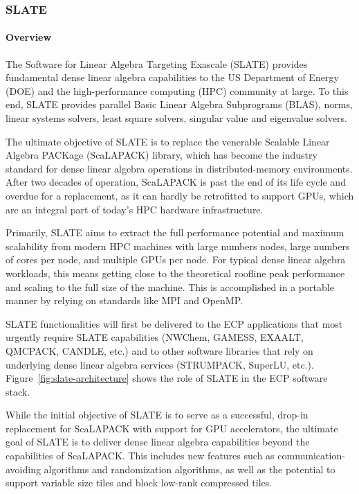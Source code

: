 \subsubsection{ SLATE}\label{subsubsect:slate}

\paragraph{Overview}

The Software for Linear Algebra Targeting Exascale (SLATE)
provides fundamental dense linear algebra capabilities
to the US Department of Energy (DOE)
and the high-performance computing (HPC) community at large.
To this end, SLATE provides
parallel Basic Linear Algebra Subprograms (BLAS), norms,
linear systems solvers, least square solvers,
singular value and eigenvalue solvers.

The ultimate objective of SLATE is to replace the
venerable Scalable Linear Algebra PACKage (ScaLAPACK) library,
which has become the industry standard for dense linear algebra operations
in distributed-memory environments.
After two decades of operation,
ScaLAPACK is past the end of its life cycle and overdue for a replacement,
as it can hardly be retrofitted to support GPUs,
which are an integral part of today's HPC hardware infrastructure.

Primarily, SLATE aims to extract the full performance potential and maximum
scalability from modern HPC machines with large numbers nodes,
large numbers of cores per node, and multiple GPUs per node.
For typical dense linear algebra workloads, this means getting close
to the theoretical roofline peak performance and scaling to the full size of
the machine.
This is accomplished in a portable manner by relying on standards
like MPI and OpenMP.

SLATE functionalities will first be delivered to the ECP applications
that most urgently require SLATE capabilities
(NWChem, GAMESS, EXAALT, QMCPACK, CANDLE, etc.)
and to other software libraries
that rely on underlying dense linear algebra services
(STRUMPACK, SuperLU, etc.).
Figure~\ref{fig:slate-architecture} shows the role of SLATE
in the ECP software stack.

While the initial objective of SLATE is to serve as a successful,
drop-in replacement for ScaLAPACK with support for GPU accelerators,
the ultimate goal of SLATE is to deliver dense linear algebra capabilities
beyond the capabilities of ScaLAPACK.
This includes new features such as communication-avoiding
algorithms and randomization algorithms, as well as the potential to
support variable size tiles and block low-rank compressed tiles.

